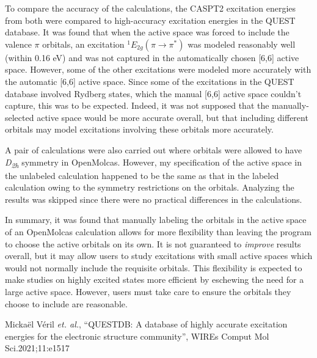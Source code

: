 \documentclass[12pt,letterpaper]{article}
\begin{document}
	To compare the accuracy of the calculations, the CASPT2 excitation energies from both were compared to high-accuracy excitation energies in the QUEST database.  It was found that when the active space was forced to include the valence $\pi$ orbitals, an excitation $^1E_{2g}(\pi\rightarrow\pi^*)$ was modeled reasonably well (within 0.16 eV) and was not captured in the automatically chosen [6,6] active space.  However, some of the other excitations were modeled more accurately with the automatic [6,6] active space.  Since some of the excitations in the QUEST database involved Rydberg states, which the manual [6,6] active space couldn't capture, this was to be expected.  Indeed, it was not supposed that the manually-selected active space would be more accurate overall, but that including different orbitals may model excitations involving these orbitals more accurately.
	
	A pair of calculations were also carried out where orbitals were allowed to have \textit{D\textsubscript{2h}} symmetry in OpenMolcas.  However, my specification of the active space in the unlabeled calculation happened to be the same as that in the labeled calculation owing to the symmetry restrictions on the orbitals.  Analyzing the results was skipped since there were no practical differences in the calculations.
	
	In summary, it was found that manually labeling the orbitals in the active space of an OpenMolcas calculation allows for more flexibility than leaving the program to choose the active orbitals on its own.  It is not guaranteed to \textit{improve} results overall, but it may allow users to study excitations with small active spaces which would not normally include the requisite orbitals.  This flexibility is expected to make studies on highly excited states more efficient by eschewing the need for a large active space.  However, users must take care to ensure the orbitals they choose to include are reasonable.
	
	\begin{footnotesize}
		Micka\"{e}l V\'{e}ril \textit{et. al.}, ``QUESTDB: A database of highly accurate excitation energies for the electronic structure community'', WIREs Comput Mol Sci.2021;11:e1517
	\end{footnotesize}
\end{document}
